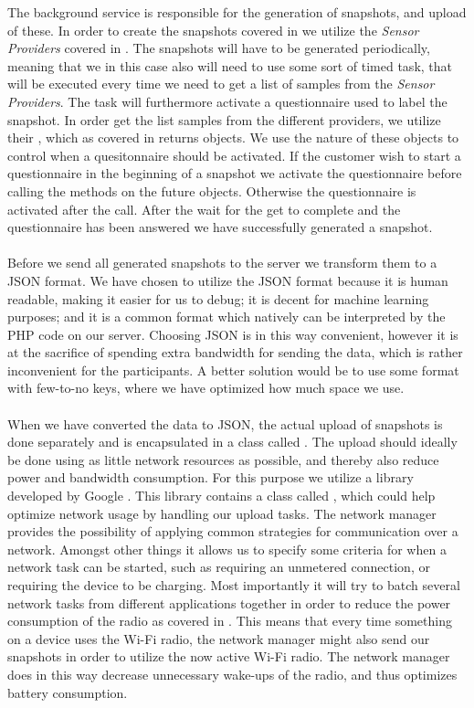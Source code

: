 The background service is responsible for the generation of snapshots, and upload of these. In order to create the snapshots covered in  we utilize the \emph{Sensor Providers} covered in . The snapshots will have to be generated periodically, meaning that we in this case also will need to use some sort of timed task, that will be executed every time we need to get a list of samples from the \emph{Sensor Providers}. The task will furthermore activate a questionnaire used to label the snapshot. In order get the list samples from the different providers, we utilize their , which as covered in  returns  objects. We use the nature of these objects to control when a quesitonnaire should be activated. If the customer wish to start a questionnaire in the beginning of a snapshot we activate the questionnaire before calling the  methods on the future objects. Otherwise the questionnaire is activated after the call. After the wait for the get to complete and the questionnaire has been answered we have successfully generated a snapshot.
\\\\
Before we send all generated snapshots to the server we transform them to a JSON format. We have chosen to utilize the JSON format because it is human readable, making it easier for us to debug; it is decent for machine learning purposes; and it is a common format which natively can be interpreted by the PHP code on our server. Choosing JSON is in this way convenient, however it is at the sacrifice of spending extra bandwidth for sending the data, which is rather inconvenient for the participants. A better solution would be to use some format with few-to-no keys, where we have optimized how much space we use. 
\\\\
When we have converted the data to JSON, the actual upload of snapshots is done separately and is encapsulated in a class called . The upload should ideally be done using as little network resources as possible, and thereby also reduce power and bandwidth consumption. For this purpose we utilize a library developed by Google \parencite{gcmnetworkmanager}. This library contains a class called , which could help optimize network usage by handling our upload tasks. The network manager provides the possibility of applying common strategies for communication over a network. Amongst other things it allows us to specify some criteria for when a network task can be started, such as requiring an unmetered connection, or requiring the device to be charging. Most importantly it will try to batch several network tasks from different applications together in order to reduce the power consumption of the radio as covered in . This means that every time something on a device uses the Wi-Fi radio, the network manager might also send our snapshots in order to utilize the now active Wi-Fi radio. The network manager does in this way decrease unnecessary wake-ups of the radio, and thus optimizes battery consumption.
